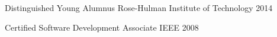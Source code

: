 
\begin{cvhonors}

  \cvhonor
    {Distinguished Young Alumnus}
    {Rose-Hulman Institute of Technology}
    {2014}

  \cvhonor
    {Certified Software Development Associate}
    {IEEE}
    {2008}

\end{cvhonors}
